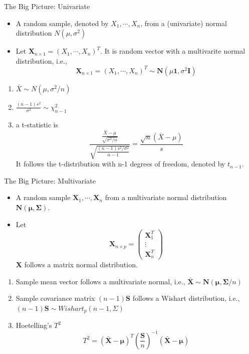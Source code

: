 \documentclass[
  ignorenonframetext,
]{beamer}
\providecommand{\tightlist}{%
  \setlength{\itemsep}{0pt}\setlength{\parskip}{0pt}}
\begin{document}
\begin{frame}{The Big Picture: Univariate}
\protect\hypertarget{the-big-picture-univariate}{}
\begin{itemize}
\tightlist
\item
  A random sample, denoted by \(X_1, \cdots, X_n\), from a (univariate)
  normal distribution \(N(\mu, \sigma^2)\)
\item
  Let \(\mathbf X_{n\times 1}=(X_1, \cdots, X_n)^T\). It is random
  vector with a multivarite normal distribution, i.e.,
  \[\mathbf X_{n\times 1}=(X_1, \cdots, X_n)^T \sim \mathbf N(\mu\mathbf 1, \sigma^2\mathbf I)\]
\end{itemize}

\begin{enumerate}
\tightlist
\item
  \(\bar X \sim N(\mu, \sigma^2/n)\)
\item
  \(\frac{(n-1)s^2}{\sigma^2} \sim \chi_{n-1}^2\)
\item
  a t-statistic is
  \[\frac{\frac{\bar X-\mu}{\sqrt{\sigma^2/n}}}{\sqrt{\frac{(n-1)s^2/\sigma^2}{n-1}}}=\frac{\sqrt{n}(\bar X-\mu)}{s}\]
  It follows the t-distribution with n-1 degrees of freedom, denoted by
  \(t_{n-1}\).
\end{enumerate}
\end{frame}

\begin{frame}{The Big Picture: Multivariate}
\protect\hypertarget{the-big-picture-multivariate}{}
\begin{itemize}
\tightlist
\item
  A random sample \(\mathbf X_1, \cdots, \mathbf X_n\) from a
  multivariate normal distribution
  \(\mathbf N(\boldsymbol \mu, \boldsymbol \Sigma)\).
\item
  Let \[\mathbf X_{n\times p}=\begin{pmatrix}
  \mathbf X_1^T \\ \vdots \\\mathbf X_n^T
  \end{pmatrix}\] \(\mathbf X\) follows a matrix normal distribution.
\end{itemize}

\begin{enumerate}
\item
  Sample mean vector follows a multivariate normal, i.e.,
  \(\bar{\mathbf X} \sim \mathbf N(\boldsymbol \mu, \boldsymbol \Sigma/n)\)
\item
  Sample covariance matrix \((n-1)\mathbf S\) follows a Wishart
  distribution, i.e., \((n-1)\mathbf S \sim Wishart_p (n-1, \Sigma)\)
\item
  Hoetelling's \(T^2\)
  \[T^2 = (\bar{\mathbf X} - \boldsymbol \mu)^T\left(\frac{\mathbf S}{n}\right)^{-1} (\bar{\mathbf X} - \boldsymbol \mu)\]
\end{enumerate}
\end{frame}
\end{document}
